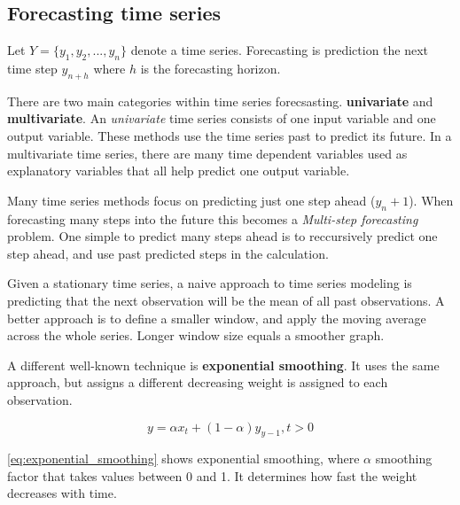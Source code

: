 \subsection{Forecasting time series}
Let  $Y = \{y_1, y_2, ..., y_n\}$ denote a time series.
Forecasting is prediction the next time step $y_{n+h}$ where $h$ is the forecasting horizon.

There are two main categories within time series forecsasting. \textbf{univariate} and \textbf{multivariate}. 
An \textit{univariate} time series consists of one input variable and one output variable. These methods use the time series past to predict its future.
In a multivariate time series, there are many time dependent variables used as explanatory variables that all help predict one output variable.


Many time series methods focus on predicting just one step ahead ($y_n+1$). When forecasting many steps into the future this becomes a 
\textit{Multi-step forecasting} problem. One simple to predict many steps ahead is to reccursively predict one step ahead, and use past predicted steps 
in the calculation.


Given a stationary time series, a naive approach to time series modeling is predicting that the next observation will be the
mean of all past observations. A better approach is to define a smaller window, and
apply the moving average across the whole series. Longer window size equals a smoother graph.

A different well-known technique is \textbf{exponential smoothing}. It uses the same approach,
but assigns a different decreasing weight is assigned to each observation.

\begin{equation}
    \label{eq:exponential_smoothing}
    y = \alpha x_t + (1 - \alpha)y_{y-1}, t > 0
\end{equation}

\autoref{eq:exponential_smoothing}
shows exponential smoothing, where $\alpha$ smoothing factor
that takes values between 0 and 1. It determines how fast the weight decreases with time.





